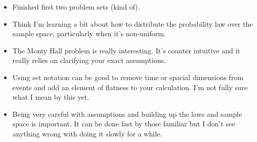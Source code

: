 \documentclass[11pt]{article}
\begin{document}
\begin{itemize}
\tightlist
\item
  Finished first two problem sets (kind of).
\item
  Think I'm learning a bit about how to distribute the probability law
  over the sample space, particularly when it's non-uniform.
\item
  The Monty Hall problem is really interesting. It's counter intuitive
  and it really relies on clarifying your exact assumptions.
\item
  Using set notation can be good to remove time or spacial dimensions
  from events and add an element of flatness to your calculation. I'm
  not fully sure what I mean by this yet.
\item
  Being very careful with assumptions and building up the laws and
  sample space is important. It can be done fast by those familiar but I
  don't see anything wrong with doing it slowly for a while.
\end{itemize}
\end{document}
